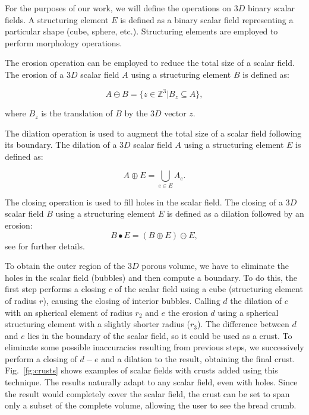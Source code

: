 For the purposes of our work, we will define the operations on $3D$ binary scalar fields.
A structuring element $E$ is defined as a binary scalar field representing a particular shape (cube, sphere, etc.).
Structuring elements are employed to perform morphology operations.

The erosion operation can be employed to reduce the total size of a scalar field.
The erosion of a $3D$ scalar field $A$ using a structuring element $B$ is defined as:

\begin{equation}
A \ominus B = \{z\in \mathbb{Z}^3 | B_{z} \subseteq A\},
\end{equation}

\noindent where $B_{z}$ is the translation of $B$ by the $3D$ vector $z$.

The dilation operation is used to augment the total size of a scalar field following its boundary.
The dilation of a $3D$ scalar field $A$ using a structuring element $E$ is defined as:

\begin{equation}
A  \oplus E = \bigcup_{e\in E} A_e.
\end{equation}

The closing operation is used to fill holes in the scalar field.
The closing of a $3D$ scalar field $B$ using a structuring element $E$ is defined as a dilation followed by an erosion:
\begin{equation}
B \bullet E = (B \oplus E) \ominus E,
\end{equation}
see \cite{Gonzalez2001} for further details.

To obtain the outer region of the $3D$ porous volume, we have to eliminate the holes in the scalar field (bubbles) and then compute a boundary.
To do this, the first step performs a closing $c$ of the scalar field using a cube (structuring element of radius $r$), causing the closing of interior bubbles.
Calling $d$ the dilation of $c$ with an spherical element of radius $r_{2}$ and $e$ the erosion $d$ using a spherical structuring element with a slightly shorter radius ($r_{3}$).
The difference between $d$ and $e$ lies in the boundary of the scalar field, so it could be used as a crust.
To eliminate some possible inaccuracies resulting from previous steps, we successively perform a closing of $d-e$ and a dilation to the result, obtaining the final crust.
Fig.~\ref{fg:crusts} shows examples of scalar fields with crusts added using this technique. The results naturally adapt to any scalar field, even with holes.
Since the result would completely cover the scalar field, the crust can be set to span only a subset of the complete volume, allowing the user to see the bread crumb.

